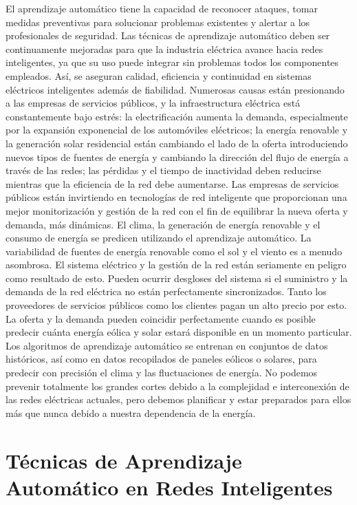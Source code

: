 \documentclass[crop=false]{standalone}
\begin{document}
El aprendizaje automático tiene la capacidad de reconocer ataques, tomar medidas preventivas para solucionar problemas existentes y alertar a los profesionales de seguridad. Las técnicas de aprendizaje automático deben ser continuamente mejoradas para que la industria eléctrica avance hacia redes inteligentes, ya que su uso puede integrar sin problemas todos los componentes empleados. Así, se aseguran calidad, eficiencia y continuidad en sistemas eléctricos inteligentes además de fiabilidad.
Numerosas causas están presionando a las empresas de servicios públicos, y la infraestructura eléctrica está constantemente bajo estrés: la electrificación aumenta la demanda, especialmente por la expansión exponencial de los automóviles eléctricos; la energía renovable y la generación solar residencial están cambiando el lado de la oferta introduciendo nuevos tipos de fuentes de energía y cambiando la dirección del flujo de energía a través de las redes; las pérdidas y el tiempo de inactividad deben reducirse mientras que la eficiencia de la red debe aumentarse. Las empresas de servicios públicos están invirtiendo en tecnologías de red inteligente que proporcionan una mejor monitorización y gestión de la red con el fin de equilibrar la nueva oferta y demanda, más dinámicas.
El clima, la generación de energía renovable y el consumo de energía se predicen utilizando el aprendizaje automático. La variabilidad de fuentes de energía renovable como el sol y el viento es a menudo asombrosa. El sistema eléctrico y la gestión de la red están seriamente en peligro como resultado de esto. Pueden ocurrir desgloses del sistema si el suministro y la demanda de la red eléctrica no están perfectamente sincronizados.
Tanto los proveedores de servicios públicos como los clientes pagan un alto precio por esto. La oferta y la demanda pueden coincidir perfectamente cuando es posible predecir cuánta energía eólica y solar estará disponible en un momento particular. Los algoritmos de aprendizaje automático se entrenan en conjuntos de datos históricos, así como en datos recopilados de paneles eólicos o solares, para predecir con precisión el clima y las fluctuaciones de energía.
No podemos prevenir totalmente los grandes cortes debido a la complejidad e interconexión de las redes eléctricas actuales, pero debemos planificar y estar preparados para ellos más que nunca debido a nuestra dependencia de la energía.

\section{Técnicas de Aprendizaje Automático en Redes Inteligentes}
\end{document}
